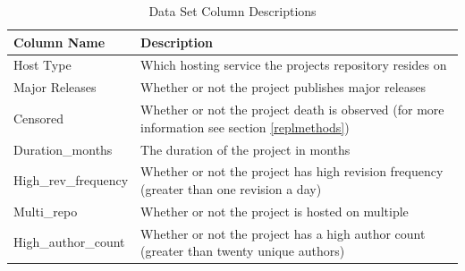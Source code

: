 \documentclass[acmconf]{acmart}
\begin{document}
\begin{table}[h!]
    \caption{Data Set Column Descriptions}
    \label{tab:data}
    \begin{tabular}{ll}
        \toprule
        Column Name & Description \\
        \midrule
        Host Type            & Which hosting service the projects repository resides on \\
        Major Releases       & Whether or not the project publishes major releases \\
        Censored             & Whether or not the project death is observed (for more information see section \ref{replmethods}) \\
        Duration\_months     & The duration of the project in months \\
        High\_rev\_frequency & Whether or not the project has high revision frequency (greater than one revision a day) \\
        Multi\_repo          & Whether or not the project is hosted on multiple \\
        High\_author\_count  & Whether or not the project has a high author count (greater than twenty unique authors) \\
        \bottomrule
    \end{tabular}
\end{table}


\end{document}
